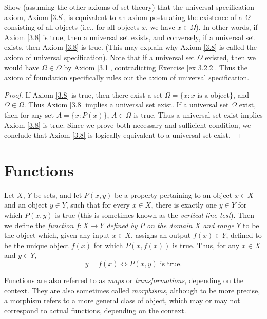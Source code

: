 \begin{exercise}\label{ex 3.2.3}
Show (assuming the other axioms of set theory) that the universal specification axiom, Axiom \ref{3.8}, is equivalent to an axiom postulating the existence of a  \(\Omega\) consisting of all objects (i.e., for all objects \(x\), we have \(x \in \Omega\)).
In other words, if Axiom \ref{3.8} is true, then a universal set exists, and conversely, if a universal set exists, then Axiom \ref{3.8} is true.
(This may explain why Axiom \ref{3.8} is called the axiom of universal specification).
Note that if a universal set \(\Omega\) existed, then we would have \(\Omega \in \Omega\) by Axiom \ref{3.1}, contradicting Exercise \ref{ex 3.2.2}.
Thus the axiom of foundation specifically rules out the axiom of universal specification.
\end{exercise}

\begin{proof}
If Axiom \ref{3.8} is true, then there exist a set \(\Omega = \{x: x \text{ is a object}\}\), and \(\Omega \in \Omega\).
Thus Axiom \ref{3.8} implies a universal set exist.
If a universal set \(\Omega\) exist, then for any set \(A = \{x: P(x)\}\), \(A \in \Omega\) is true.
Thus a universal set exist implies Axiom \ref{3.8} is true.
Since we prove both necessary and sufficient condition, we conclude that Axiom \ref{3.8} is logically equivalent to a universal set exist.
\end{proof}

\section{Functions}

\begin{definition}[Functions]\label{3.3.1}
Let \(X\), \(Y\) be sets, and let \(P(x, y)\) be a property pertaining to an object \(x \in X\) and an object \(y \in Y\), such that for every \(x \in X\), there is exactly one \(y \in Y\) for which \(P(x, y)\) is true (this is sometimes known as the \emph{vertical line test}).
Then we define the \emph{function} \(f : X \to Y\) \emph{defined by} \(P\) \emph{on the domain} \(X\) \emph{and range} \(Y\) to be the object which, given any input \(x \in X\), assigns an output \(f(x) \in Y\), defined to be the unique object \(f(x)\) for which \(P(x, f(x))\) is true.
Thus, for any \(x \in X\) and \(y \in Y\),
\[
    y = f(x) \iff P(x, y) \text{ is true}.
\]
\end{definition}

\begin{note}
Functions are also referred to as \emph{maps} or \emph{transformations}, depending on the context.
They are also sometimes called \emph{morphisms}, although to be more precise, a morphism refers to a more general class of object, which may or may not correspond to actual functions, depending on the context.
\end{note}


